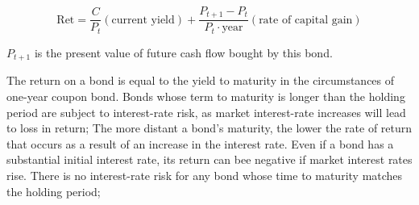 \documentclass[10pt, a4paper]{article}
\begin{document}
        $$\text{Ret} = \frac{C}{P_t}(\text{current yield}) + \frac{P_{t + 1} - P_t}{P_t \cdot \text{year}}(\text{rate of capital gain})$$

        $P_{t+1}$ is the present value of future cash flow bought by this bond.
        
        The return on a bond is equal to the yield to maturity in the circumstances of one-year coupon bond. Bonds whose term to maturity is longer than the holding period are subject to interest-rate risk, as market interest-rate increases will lead to loss in return; The more distant a bond's maturity, the lower the rate of return that occurs as a result of an increase in the interest rate. Even if a bond has a substantial initial interest rate, its return can bee negative if market interest rates rise. There is no interest-rate risk for any bond whose time to maturity matches the holding period;
\end{document}
